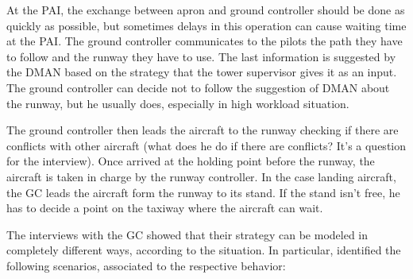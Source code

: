 \documentclass{article}
\begin{document}
At the PAI, the exchange between apron and ground controller should be done as quickly as possible, but sometimes delays in this operation can cause waiting time at the PAI. 
The ground controller communicates to the pilots the path they have to follow and the runway they have to use. The last information is suggested by the DMAN based on the strategy that the tower supervisor gives it as an input. The ground controller can decide not to follow the suggestion of DMAN about the runway, but he usually does, especially in high workload situation. 

The ground controller then leads the aircraft to the runway checking if there are conflicts with other aircraft (what does he do if there are conflicts? It's a question for the interview).
Once arrived at the holding point before the runway, the aircraft is taken in charge by the runway controller. In the case landing aircraft, the GC leads the aircraft form the runway to its stand. If the stand isn't free, he has to decide a point on the taxiway where the aircraft can wait.

The interviews with the GC showed that their strategy can be modeled in completely different ways, according to the situation. In particular, identified the following scenarios, associated to the respective behavior:
\end{document}
